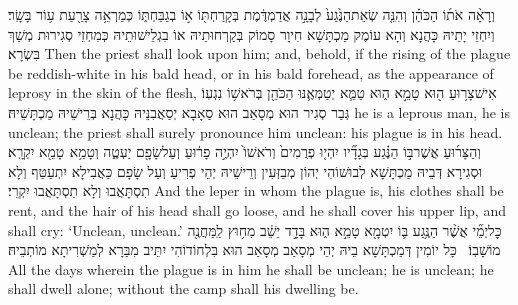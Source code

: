 {וְרָאָ֨ה אֹת֜וֹ הַכֹּהֵ֗ן וְהִנֵּ֤ה שְׂאֵת\maqqaf הַנֶּ֙גַע֙ לְבָנָ֣ה אֲדַמְדֶּ֔מֶת בְּקָרַחְתּ֖וֹ א֣וֹ בְגַבַּחְתּ֑וֹ כְּמַרְאֵ֥ה צָרַ֖עַת ע֥וֹר בָּשָֽׂר׃}
{וְיִחְזֵי יָתֵיהּ כָּהֲנָא וְהָא עוֹמֶק מַכְתָּשָׁא חִיוָר סָמוֹק בְּקַרְחוּתֵיהּ אוֹ בִגְלֵישׁוּתֵיהּ כְּמִחְזֵי סְגִירוּת מְשַׁךְ בִּשְׂרָא׃}
{Then the priest shall look upon him; and, behold, if the rising of the plague be reddish-white in his bald head, or in his bald forehead, as the appearance of leprosy in the skin of the flesh,}{}
{אִישׁ\maqqaf צָר֥וּעַ ה֖וּא טָמֵ֣א ה֑וּא טַמֵּ֧א יְטַמְּאֶ֛נּוּ הַכֹּהֵ֖ן בְּרֹאשׁ֥וֹ נִגְעֽוֹ׃}
{גְּבַר סְגִיר הוּא מְסָאַב הוּא סַאָבָא יְסַאֲבִנֵּיהּ כָּהֲנָא בְּרֵישֵׁיהּ מַכְתָּשֵׁיהּ׃}
{he is a leprous man, he is unclean; the priest shall surely pronounce him unclean: his plague is in his head.}{}
{וְהַצָּר֜וּעַ אֲשֶׁר\maqqaf בּ֣וֹ הַנֶּ֗גַע בְּגָדָ֞יו יִהְי֤וּ פְרֻמִים֙ וְרֹאשׁוֹ֙ יִהְיֶ֣ה פָר֔וּעַ וְעַל\maqqaf שָׂפָ֖ם יַעְטֶ֑ה וְטָמֵ֥א \pasek  טָמֵ֖א יִקְרָֽא׃}
{וּסְגִירָא דְּבֵיהּ מַכְתָּשָׁא לְבוּשׁוֹהִי יְהוֹן מְבַזְּעִין וְרֵישֵׁיהּ יְהֵי פְרִיעַ וְעַל שָׂפָם כַּאֲבִילָא יִתְעַטַּף וְלָא תִסְתָּאֲבוּ וְלָא תִסְתָּאֲבוּ יִקְרֵי׃}
{And the leper in whom the plague is, his clothes shall be rent, and the hair of his head shall go loose, and he shall cover his upper lip, and shall cry: ‘Unclean, unclean.’}{}
{כׇּל\maqqaf יְמֵ֞י אֲשֶׁ֨ר הַנֶּ֥גַע בּ֛וֹ יִטְמָ֖א טָמֵ֣א ה֑וּא בָּדָ֣ד יֵשֵׁ֔ב מִח֥וּץ לַֽמַּחֲנֶ֖ה מוֹשָׁבֽוֹ׃ \setuma }
{כָּל יוֹמִין דְּמַכְתָּשָׁא בֵיהּ יְהֵי מְסָאַב מְסָאַב הוּא בִּלְחוֹדוֹהִי יִתֵּיב מִבַּרָא לְמַשְׁרִיתָא מוֹתְבֵיהּ׃}
{All the days wherein the plague is in him he shall be unclean; he is unclean; he shall dwell alone; without the camp shall his dwelling be.}{}
